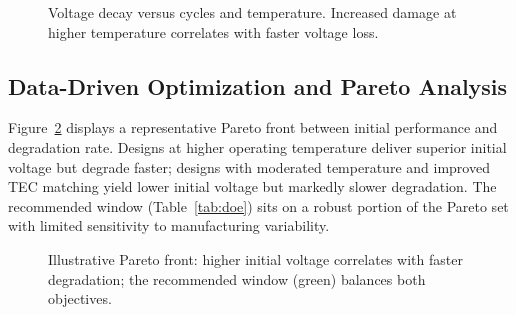 \documentclass[conference]{IEEEtran}
\begin{document}
\begin{figure}[t]
  \centering
  \caption{Voltage decay versus cycles and temperature. Increased damage at higher temperature correlates with faster voltage loss.}
  \label{fig:voltage}
  \vspace{-0.5em}
\end{figure}

\subsection{Data-Driven Optimization and Pareto Analysis}
Figure~\ref{fig:pareto} displays a representative Pareto front between initial performance and degradation rate. Designs at higher operating temperature deliver superior initial voltage but degrade faster; designs with moderated temperature and improved TEC matching yield lower initial voltage but markedly slower degradation. The recommended window (Table~\ref{tab:doe}) sits on a robust portion of the Pareto set with limited sensitivity to manufacturing variability.

\begin{figure}[t]
  \centering
  \caption{Illustrative Pareto front: higher initial voltage correlates with faster degradation; the recommended window (green) balances both objectives.}
  \label{fig:pareto}
  \vspace{-0.5em}
\end{figure}
\end{document}
